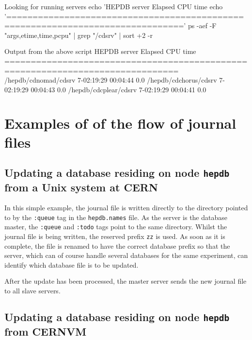 \begin{XMPt}{Looking for running servers}
echo 'HEPDB server                                        Elapsed     CPU time   %
echo '==============================================================================='
ps -aef -F "args,etime,time,pcpu" | grep "/cdsrv" | sort +2 -r
\end{XMPt}

\begin{XMPt}{Output from the above script}
HEPDB server                                        Elapsed     CPU time   %
===============================================================================
/hepdb/cdnomad/cdsrv                              7-02:19:29    00:04:44   0.0
/hepdb/cdchorus/cdsrv                             7-02:19:29    00:04:43   0.0
/hepdb/cdcplear/cdsrv                             7-02:19:29    00:04:41   0.0
\end{XMPt}

\chapter{Examples of of the flow of journal files}

\section{Updating a database residing on node {\tt hepdb} from a Unix system at CERN}

In this simple example, the journal file is written directly to the directory
pointed to by the {\tt :queue} tag in the {\tt hepdb.names} file. As the
server is the database master, the {\tt :queue} and {\tt :todo} tags point to
the same directory. Whilst the journal file is being written, the reserved prefix
{\tt zz} is used. As soon as it is complete, the file is renamed to have the
correct database prefix so that the server, which can of course handle several
databases for the same experiment, can identify which database file is to be updated.

After the update has been processed, the master server sends the new journal file
to all slave servers.

\section{Updating a database residing on node {\tt hepdb} from CERNVM}

